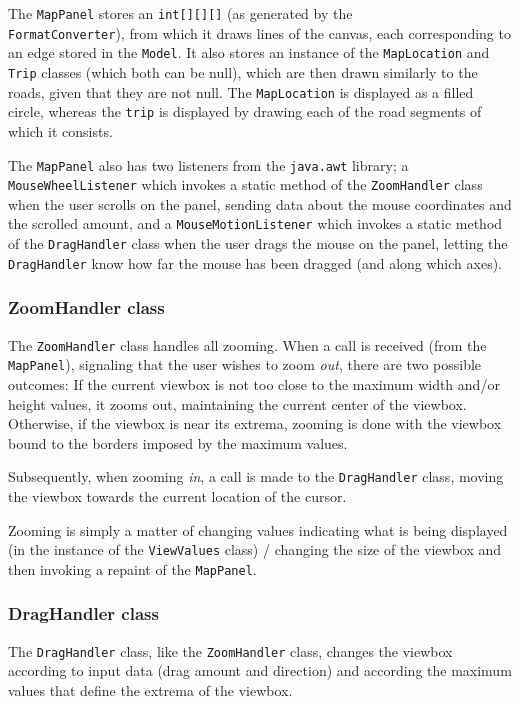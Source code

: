 The \texttt{MapPanel} stores an \texttt{int[][][]} (as generated by the \\ \texttt{FormatConverter}), from which it draws lines of the canvas, each corresponding to an edge stored in the \texttt{Model}. It also stores an instance of the \texttt{MapLocation} and \texttt{Trip} classes (which both can be null), which are then drawn similarly to the roads, given that they are not null. The \texttt{MapLocation} is displayed as a filled circle, whereas the \texttt{trip} is displayed by drawing each of the road segments of which it consists.

The \texttt{MapPanel} also has two listeners from the \texttt{java.awt} library; a \\\texttt{MouseWheelListener} which invokes a static method of the \texttt{ZoomHandler} class when the user scrolls on the panel, sending data about the mouse coordinates and the scrolled amount, and a \texttt{MouseMotionListener} which invokes a static method of the \texttt{DragHandler} class when the user drags the mouse on the panel, letting the \texttt{DragHandler} know how far the mouse has been dragged (and along which axes).

\subsubsection{ZoomHandler class} %
The \texttt{ZoomHandler} class handles all zooming. When a call is received (from the \texttt{MapPanel}), signaling that the user wishes to zoom \textsl{out}, there are two possible outcomes: If the current viewbox is not too close to the maximum width and/or height values, it zooms out, maintaining the current center of the viewbox. Otherwise, if the viewbox is near its extrema, zooming is done with the viewbox bound to the borders imposed by the maximum values.

Subsequently, when zooming \textsl{in}, a call is made to the \texttt{DragHandler} class, moving the viewbox towards the current location of the cursor.

Zooming is simply a matter of changing values indicating what is being displayed (in the instance of the \texttt{ViewValues} class) / changing the size of the viewbox and then invoking a repaint of the \texttt{MapPanel}.

\subsubsection{DragHandler class} %
The \texttt{DragHandler} class, like the \texttt{ZoomHandler} class, changes the viewbox according to input data (drag amount and direction) and according the maximum values that define the extrema of the viewbox.

